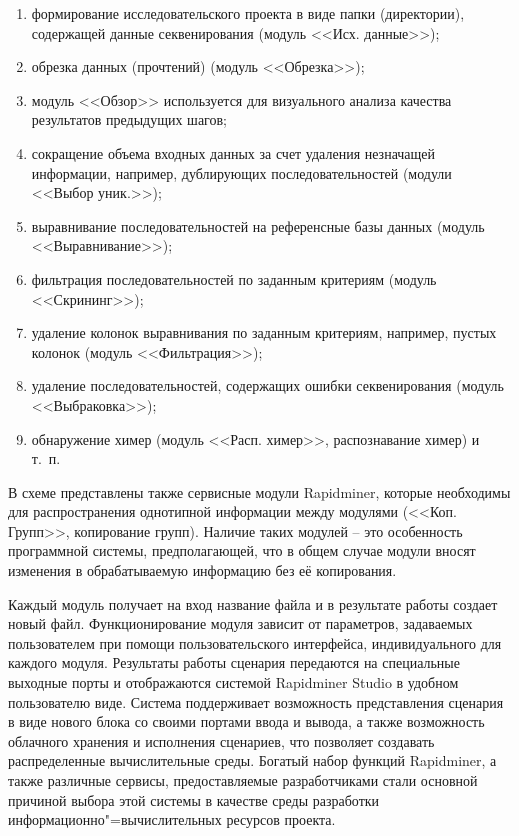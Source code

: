 \documentclass[a4paper,12pt,openany,final]{extreport}
\begin{document}
\begin{enumerate}
\item формирование исследовательского проекта в виде папки (директории), содержащей данные секвенирования (модуль <<Исх. данные>>);
\item обрезка данных (прочтений) (модуль <<Обрезка>>);
\item модуль <<Обзор>> используется для визуального анализа качества результатов предыдущих шагов;
\item сокращение объема входных данных за счет удаления незначащей информации, например, дублирующих последовательностей (модули <<Выбор уник.>>);
\item выравнивание последовательностей на референсные базы данных (модуль <<Выравнивание>>);
\item фильтрация последовательностей по заданным критериям (модуль <<Скрининг>>);
\item удаление колонок выравнивания по заданным критериям, например, пустых колонок (модуль <<Фильтрация>>);
\item удаление последовательностей, содержащих ошибки секвенирования (модуль <<Выбраковка>>);
\item обнаружение химер (модуль <<Расп. химер>>, распознавание химер) и т.~п.
\end{enumerate}

В схеме представлены также сервисные модули Rapidminer, которые необходимы для распространения однотипной информации между модулями (<<Коп. Групп>>, копирование групп). Наличие таких модулей -- это особенность программной системы, предполагающей, что в общем случае модули вносят изменения в обрабатываемую информацию без её копирования.

Каждый модуль получает на вход название файла и в результате работы создает новый файл. Функционирование модуля зависит от параметров, задаваемых пользователем при помощи пользовательского интерфейса, индивидуального для каждого модуля. Результаты работы сценария передаются на специальные выходные порты и отображаются системой Rapidminer Studio в удобном пользователю виде. Система поддерживает возможность представления сценария в виде нового блока со своими портами ввода и вывода, а также возможность облачного хранения и исполнения сценариев, что позволяет создавать распределенные вычислительные среды.  Богатый набор функций Rapidminer, а также различные сервисы, предоставляемые разработчиками стали основной причиной выбора этой системы в качестве среды разработки информационно"=вычислительных ресурсов проекта.
\end{document}
